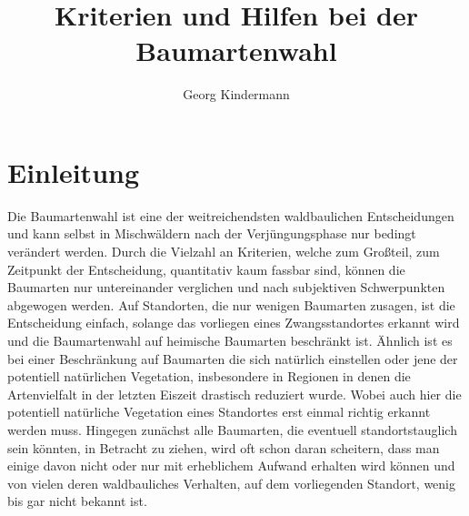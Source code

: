 \documentclass[twocolumn]{scrartcl}
\title{Kriterien und Hilfen bei der Baumartenwahl}
\author{Georg Kindermann}
\begin{document}
\twocolumn[
  \begin{@twocolumnfalse}
    \maketitle
    \begin{abstract}

    \end{abstract}
  \end{@twocolumnfalse}
]

\tableofcontents

\section{Einleitung}

Die Baumartenwahl ist eine der weitreichendsten waldbaulichen
Entscheidungen und kann selbst in Mischwäldern nach der
Verjüngungsphase nur bedingt verändert werden. Durch die Vielzahl an
Kriterien, welche zum Großteil, zum Zeitpunkt der Entscheidung,
quantitativ kaum fassbar sind, können die Baumarten nur untereinander
verglichen und nach subjektiven Schwerpunkten abgewogen werden. Auf
Standorten, die nur wenigen Baumarten zusagen, ist die Entscheidung
einfach, solange das vorliegen eines Zwangsstandortes erkannt wird und
die Baumartenwahl auf heimische Baumarten beschränkt ist. Ähnlich ist
es bei einer Beschränkung auf Baumarten die sich natürlich einstellen
oder jene der potentiell natürlichen Vegetation, insbesondere in
Regionen in denen die Artenvielfalt in der letzten Eiszeit drastisch
reduziert wurde. Wobei auch hier die potentiell natürliche Vegetation
eines Standortes erst einmal richtig erkannt werden muss. Hingegen
zunächst alle Baumarten, die eventuell standortstauglich sein könnten,
in Betracht zu ziehen, wird oft schon daran scheitern, dass man einige
davon nicht oder nur mit erheblichem Aufwand erhalten wird können und
von vielen deren waldbauliches Verhalten, auf dem vorliegenden
Standort, wenig bis gar nicht bekannt ist.
\end{document}
